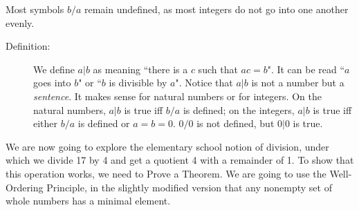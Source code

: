 \documentclass[12pt]{article}
\begin{document}
Most symbols $b/a$ remain undefined, as most integers do not go into one another evenly.

\begin{description}

\item[Definition:]  We define $a|b$ as meaning ``there is a $c$ such that $ac=b$".  It can be read ``$a$ goes into $b$" or
``$b$ is divisible by $a$".  Notice that $a|b$ is not a number but a {\em sentence\/}.   It makes sense for natural numbers or for integers.   On the natural numbers, $a|b$ is true iff $b/a$ is defined; on the integers, 
$a|b$ is true iff either $b/a$ is defined or $a=b=0$.  $0/0$ is not defined, but $0|0$ is true.

\end{description}

We are now going to explore the elementary school notion of division, under which we divide 17 by 4 and
get a quotient 4 with a remainder of 1.   To show that this operation works, we need to Prove a Theorem.
We are going to use the Well-Ordering Principle, in the slightly modified version that any nonempty set of whole numbers has a minimal element.
\end{document}
